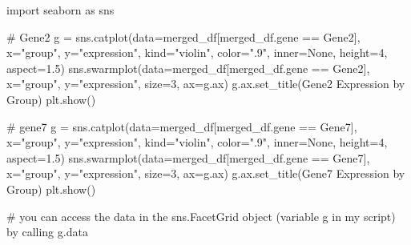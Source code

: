 \documentclass[
  letterpaper,
  DIV=11,
  numbers=noendperiod]{scrartcl}
\newenvironment{Shaded}{\begin{snugshade}}{\end{snugshade}}
\newcommand{\CommentTok}[1]{\textcolor[rgb]{0.37,0.37,0.37}{#1}}
\newcommand{\DecValTok}[1]{\textcolor[rgb]{0.68,0.00,0.00}{#1}}
\newcommand{\FloatTok}[1]{\textcolor[rgb]{0.68,0.00,0.00}{#1}}
\newcommand{\ImportTok}[1]{\textcolor[rgb]{0.00,0.46,0.62}{#1}}
\newcommand{\NormalTok}[1]{\textcolor[rgb]{0.00,0.23,0.31}{#1}}
\newcommand{\OperatorTok}[1]{\textcolor[rgb]{0.37,0.37,0.37}{#1}}
\newcommand{\StringTok}[1]{\textcolor[rgb]{0.13,0.47,0.30}{#1}}
\newcommand{\VariableTok}[1]{\textcolor[rgb]{0.07,0.07,0.07}{#1}}
\begin{document}
\begin{Shaded}
\begin{Highlighting}[]
\ImportTok{import}\NormalTok{ seaborn }\ImportTok{as}\NormalTok{ sns}

\CommentTok{\# Gene2}
\NormalTok{g }\OperatorTok{=}\NormalTok{ sns.catplot(data}\OperatorTok{=}\NormalTok{merged\_df[merged\_df.gene }\OperatorTok{==} \StringTok{\textquotesingle{}Gene2\textquotesingle{}}\NormalTok{], x}\OperatorTok{=}\StringTok{"group"}\NormalTok{, y}\OperatorTok{=}\StringTok{"expression"}\NormalTok{,}
\NormalTok{                kind}\OperatorTok{=}\StringTok{"violin"}\NormalTok{, color}\OperatorTok{=}\StringTok{".9"}\NormalTok{, inner}\OperatorTok{=}\VariableTok{None}\NormalTok{, height}\OperatorTok{=}\DecValTok{4}\NormalTok{, aspect}\OperatorTok{=}\FloatTok{1.5}\NormalTok{)}
\NormalTok{sns.swarmplot(data}\OperatorTok{=}\NormalTok{merged\_df[merged\_df.gene }\OperatorTok{==} \StringTok{\textquotesingle{}Gene2\textquotesingle{}}\NormalTok{], x}\OperatorTok{=}\StringTok{"group"}\NormalTok{, y}\OperatorTok{=}\StringTok{"expression"}\NormalTok{, size}\OperatorTok{=}\DecValTok{3}\NormalTok{, ax}\OperatorTok{=}\NormalTok{g.ax)}
\NormalTok{g.ax.set\_title(}\StringTok{\textquotesingle{}Gene2 Expression by Group\textquotesingle{}}\NormalTok{)}
\NormalTok{plt.show()}

\CommentTok{\# gene7}
\NormalTok{g }\OperatorTok{=}\NormalTok{ sns.catplot(data}\OperatorTok{=}\NormalTok{merged\_df[merged\_df.gene }\OperatorTok{==} \StringTok{\textquotesingle{}Gene7\textquotesingle{}}\NormalTok{], x}\OperatorTok{=}\StringTok{"group"}\NormalTok{, y}\OperatorTok{=}\StringTok{"expression"}\NormalTok{,}
\NormalTok{                kind}\OperatorTok{=}\StringTok{"violin"}\NormalTok{, color}\OperatorTok{=}\StringTok{".9"}\NormalTok{, inner}\OperatorTok{=}\VariableTok{None}\NormalTok{, height}\OperatorTok{=}\DecValTok{4}\NormalTok{, aspect}\OperatorTok{=}\FloatTok{1.5}\NormalTok{)}
\NormalTok{sns.swarmplot(data}\OperatorTok{=}\NormalTok{merged\_df[merged\_df.gene }\OperatorTok{==} \StringTok{\textquotesingle{}Gene7\textquotesingle{}}\NormalTok{], x}\OperatorTok{=}\StringTok{"group"}\NormalTok{, y}\OperatorTok{=}\StringTok{"expression"}\NormalTok{, size}\OperatorTok{=}\DecValTok{3}\NormalTok{, ax}\OperatorTok{=}\NormalTok{g.ax)}
\NormalTok{g.ax.set\_title(}\StringTok{\textquotesingle{}Gene7 Expression by Group\textquotesingle{}}\NormalTok{)}
\NormalTok{plt.show()}


\CommentTok{\# you can access the data in the sns.FacetGrid object (variable g in my script) by calling g.data}
\end{Highlighting}
\end{Shaded}
\end{document}
